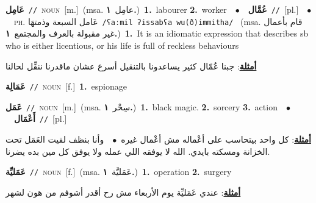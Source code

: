 \documentclass[10pt,a4paper,twoside]{article} %
\begin{document}
\begin{multicols}{2}
{\setlength\topsep{0pt}\textbf{\foreignlanguage{arabic}{عَامِل}}\ {\color{gray}\texttt{//}\color{black}}\ \textsc{noun}\ [m.]\ \color{gray}(msa. \foreignlanguage{arabic}{عامِل}~\foreignlanguage{arabic}{\textbf{١.}})\color{black}\ \textbf{1.}~labourer  \textbf{2.}~worker\ \ $\bullet$\ \ \setlength\topsep{0pt}\textbf{\foreignlanguage{arabic}{عُمَّال}}\ {\color{gray}\texttt{//}\color{black}}\ [pl.]\ \ $\bullet$\ \ \textsc{ph.} \color{gray} \foreignlanguage{arabic}{عَامل السبعة وذمتهَا}\color{black}\ {\color{gray}\texttt{/{\sffamily ʕaːmil ʔissabʕa wu(ð)immitha}/}\color{black}}\ \color{gray} (msa. \foreignlanguage{arabic}{قام بأعمال غير مقبولة بالعرف والمجتمع}~\foreignlanguage{arabic}{\textbf{١.}})\color{black}\ \textbf{1.}~It is an idiomatic expression that describes sb who is either licentious, or his life is full of reckless behaviours\  \begin{flushright}\color{gray}\foreignlanguage{arabic}{\textbf{\underline{\foreignlanguage{arabic}{أمثلة}}}: جبنا عَُمّال كثير يساعدونا بالتنقيل أسرع عشان ماقدرنا ننقِّل لحالنا}\end{flushright}\color{black}} \vspace{2mm}

{\setlength\topsep{0pt}\textbf{\foreignlanguage{arabic}{عَمَالِة}}\ {\color{gray}\texttt{//}\color{black}}\ \textsc{noun}\ [f.]\ \textbf{1.}~espionage\ } \vspace{2mm}

{\setlength\topsep{0pt}\textbf{\foreignlanguage{arabic}{عَمَل}}\ {\color{gray}\texttt{//}\color{black}}\ \textsc{noun}\ [m.]\ \color{gray}(msa. \foreignlanguage{arabic}{سِحْر}~\foreignlanguage{arabic}{\textbf{١.}})\color{black}\ \textbf{1.}~black magic.  \textbf{2.}~sorcery  \textbf{3.}~action\ \ $\bullet$\ \ \setlength\topsep{0pt}\textbf{\foreignlanguage{arabic}{أَعْمَال}}\ {\color{gray}\texttt{//}\color{black}}\ [pl.]\  \begin{flushright}\color{gray}\foreignlanguage{arabic}{\textbf{\underline{\foreignlanguage{arabic}{أمثلة}}}: كل واحد بيتحاسب على أعْماله مش أعْمال غيره\ $\bullet$\ \  وأنا بنظف لقيت العَمَل تحت الخزانة ومسكته بايدي. الله لا يوفقه اللي عمله ولا يوفق كل مين بده يضرنا.}\end{flushright}\color{black}} \vspace{2mm}

{\setlength\topsep{0pt}\textbf{\foreignlanguage{arabic}{عَمَليِّة}}\ {\color{gray}\texttt{//}\color{black}}\ \textsc{noun}\ [f.]\ \color{gray}(msa. \foreignlanguage{arabic}{عَمَليَّة}~\foreignlanguage{arabic}{\textbf{١.}})\color{black}\ \textbf{1.}~operation  \textbf{2.}~surgery\  \begin{flushright}\color{gray}\foreignlanguage{arabic}{\textbf{\underline{\foreignlanguage{arabic}{أمثلة}}}: عندي عَمَليِّة يوم الأربعاء مش رح أقدر أشوفم من هون لشهر}\end{flushright}\color{black}} \vspace{2mm}


\end{multicols}
\end{document}
